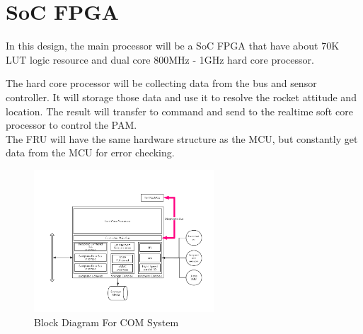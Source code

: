 \documentclass[12pt,article]{memoir}
\begin{document}
\section{SoC FPGA}
In this design, the main processor will be a SoC FPGA that have about 70K LUT logic resource and dual core 800MHz - 1GHz hard core processor.
\begin{table}[H]
	\centering
	\caption{Table of Logic Resource}
	\label{tab:rev}
\end{table}
The hard core processor will be collecting data from the bus and sensor controller. It will storage those data and use it to resolve the rocket attitude and location. The result will transfer to command and send to the realtime soft core processor to control the PAM.\\
The FRU will have the same hardware structure as the MCU, but constantly get data from the MCU for error checking.
\begin{center}
\begin{figure}[htp]
\begin{center}
\includegraphics[width=0.6\textwidth]{DR00003_Plan1.png}
 \caption{Block Diagram For COM System}	
\end{center}
\end{figure}
\end{center}

\end{document}
